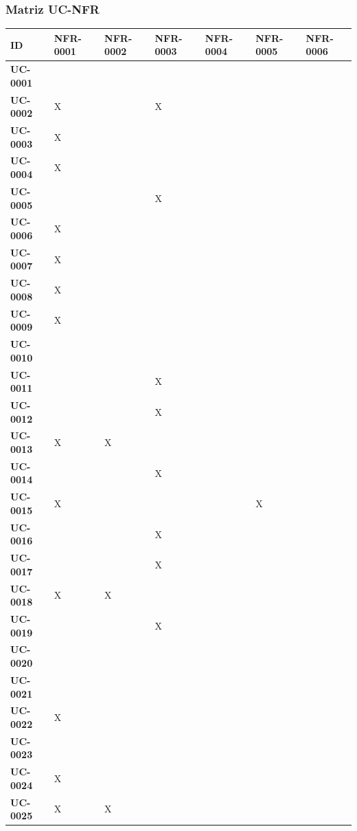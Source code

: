 \subsubsection{Matriz UC-NFR}

\begin{table}[H]
\centering
\small
\begin{tabular}{|p{2.2cm}|p{2.0cm}|p{2.0cm}|p{2.0cm}|p{2.0cm}|p{2.0cm}|p{2.0cm}|}
\hline
\textbf{ID} & \textbf{NFR-0001} & \textbf{NFR-0002} & \textbf{NFR-0003} & \textbf{NFR-0004} & \textbf{NFR-0005} & \textbf{NFR-0006} \\
\hline
\hline
\textbf{UC-0001} & & & & & & \\
\hline
\textbf{UC-0002} & X & & X & & & \\
\hline
\textbf{UC-0003} & X & & & & & \\
\hline
\textbf{UC-0004} & X & & & & & \\
\hline
\textbf{UC-0005} & & & X & & & \\
\hline
\textbf{UC-0006} & X & & & & & \\
\hline
\textbf{UC-0007} & X & & & & & \\
\hline
\textbf{UC-0008} & X & & & & & \\
\hline
\textbf{UC-0009} & X & & & & & \\
\hline
\textbf{UC-0010} & & & & & & \\
\hline
\textbf{UC-0011} & & & X & & & \\
\hline
\textbf{UC-0012} & & & X & & & \\
\hline
\textbf{UC-0013} & X & X & & & & \\
\hline
\textbf{UC-0014} & & & X & & & \\
\hline
\textbf{UC-0015} & X & & & & X & \\
\hline
\textbf{UC-0016} & & & X & & & \\
\hline
\textbf{UC-0017} & & & X & & & \\
\hline
\textbf{UC-0018} & X & X & & & & \\
\hline
\textbf{UC-0019} & & & X & & & \\
\hline
\textbf{UC-0020} & & & & & & \\
\hline
\textbf{UC-0021} & & & & & & \\
\hline
\textbf{UC-0022} & X & & & & & \\
\hline
\textbf{UC-0023} & & & & & & \\
\hline
\textbf{UC-0024} & X & & & & & \\
\hline
\textbf{UC-0025} & X & X & & & & \\

\end{tabular}
\end{table}
